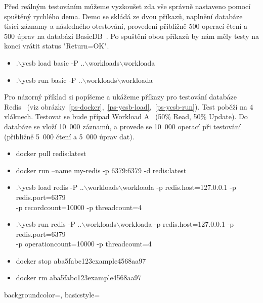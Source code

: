 \documentclass[czech,master,dept460,male,csharp,cpdeclaration]{diploma}
\begin{document}
	Před reálným testováním můžeme vyzkoušet zda vše správně nastaveno pomocí spuštěný rychlého dema. Demo se skládá ze dvou příkazů, naplnění databáze tisíci záznamy a následného otestování, provedení přibližně 500 operací čtení a 500 úprav na databázi BasicDB~\cite{basicdb}. Po spuštění obou příkazů by nám měly testy na konci vrátit status "Return=OK".
	
	\begin{itemize}
		\item .$\backslash$ycsb load basic -P ..$\backslash$workloads$\backslash$workloada
		\item .$\backslash$ycsb run basic -P ..$\backslash$workloads$\backslash$workloada
	\end{itemize}
	
	Pro názorný příklad si popíšeme a ukážeme příkazy pro testování databáze Redis~\cite{redis} (viz obrázky~\ref{ps-docker},~\ref{ps-ycsb-load},~\ref{ps-ycsb-run}). Test poběží na 4 vláknech. Testovat se bude případ Workload A~\cite{workloads} (50\% Read, 50\% Update). Do databáze se vloží 10~000 záznamů, a provede se 10~000 operací při testování (přibližně 5~000 čtení a 5~000 úprav dat).
	
	\begin{itemize}
		\item docker pull redis:latest
		\item docker run --name my-redis -p 6379:6379 -d redis:latest
		\item .$\backslash$ycsb load redis -P  ..$\backslash$workloads$\backslash$workloada -p redis.host=127.0.0.1 -p redis.port=6379 \\-p recordcount=10000 -p threadcount=4
		\item .$\backslash$ycsb run redis -P ..$\backslash$workloads$\backslash$workloada -p redis.host=127.0.0.1 -p redis.port=6379 \\-p operationcount=10000 -p threadcount=4
		\item docker stop aba5fabc123example4568aa97
		\item docker rm aba5fabc123example4568aa97
	\end{itemize}
	
	{
		backgroundcolor=\color[RGB]{1, 36, 86},
		basicstyle=\scriptsize\color{white}\ttfamily
	}
	
\end{document}
